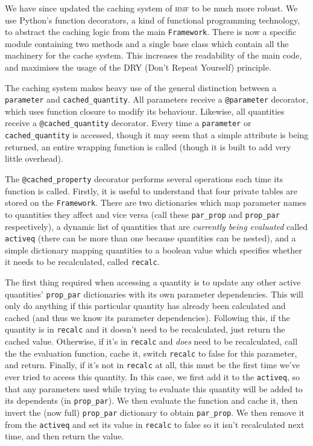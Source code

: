 \documentclass[5p]{elsarticle}
\begin{document}
We have since updated the caching system of \textsc{hmf} to be much more robust. We use Python's function decorators, a kind of functional programming technology, to abstract the caching logic from the main \verb|Framework|. There is now a specific module containing two methods and a single base class which contain all the machinery for the cache system. This increases the readability of the main code, and maximises the usage of the DRY (Don't Repeat Yourself) principle. 

The caching system makes heavy use of the general distinction between a \verb|parameter| and \verb|cached_quantity|. All parameters receive a \verb|@parameter| decorator, which uses function closure to modify its behaviour. Likewise, all quantities receive a \verb|@cached_quantity| decorator.
Every time a \verb|parameter| or \verb|cached_quantity| is accessed, though it may seem that a simple attribute is being returned, an entire wrapping function is called (though it is built to add very little overhead).

The \verb|@cached_property| decorator performs several operations each time its function is called. Firstly, it is useful to understand that four private tables are stored on the \verb|Framework|. There are two dictionaries which map parameter names to quantities they affect and vice versa (call these \verb|par_prop| and \verb|prop_par| respectively), a dynamic list of quantities that are \textit{currently being evaluated} called \verb|activeq| (there can be more than one because quantities can be nested), and a simple dictionary mapping quantities to a boolean value which specifies whether it needs to be recalculated, called \verb|recalc|.

The first thing required when accessing a quantity is to update any other active quantities' \verb|prop_par| dictionaries with its own parameter dependencies. This will only do anything if this particular quantity has already been calculated and cached (and thus we know its parameter dependencies). 
Following this, if the quantity is in \verb|recalc| and it doesn't need to be recalculated, just return the cached value.
Otherwise, if it's in \verb|recalc| and \textit{does} need to be recalculated, call the the evaluation function, cache it, switch \verb|recalc| to false for this parameter, and return.
Finally, if it's not in \verb|recalc| at all, this must be the first time we've ever tried to access this quantity. In this case, we first add it to the \verb|activeq|, so that any parameters used while trying to evaluate this quantity will be added to its dependents (in \verb|prop_par|). 
We then evaluate the function and cache it, then invert the (now full) \verb|prop_par| dictionary to obtain \verb|par_prop|. We then remove it from the \verb|activeq| and set its value in \verb|recalc| to false so it isn't recalculated next time, and then return the value.
\end{document}
